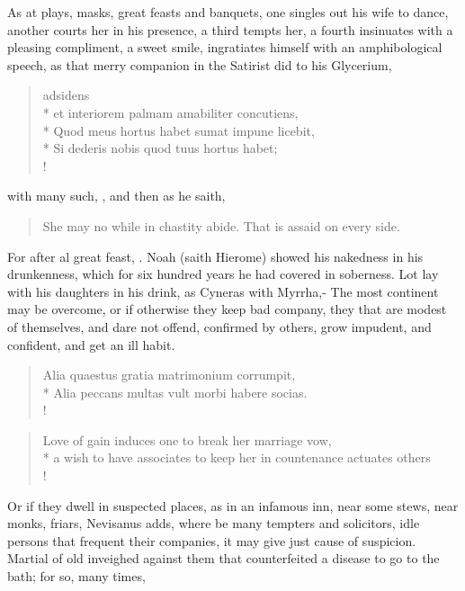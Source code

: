 As at plays, masks, great feasts and banquets, one singles out his wife
to dance, another courts her in his presence, a third tempts her, a
fourth insinuates with a pleasing compliment, a sweet smile,
ingratiates himself with an amphibological speech, as that merry
companion in the Satirist did to his Glycerium,
%
\begin{latin}%
\begin{verse}%
adsidens\\*
et interiorem palmam amabiliter concutiens,\\*
Quod meus hortus habet sumat impune licebit,\\*
Si dederis nobis quod tuus hortus habet;\\!
\end{verse}%
\end{latin}%
%
with many such, \etc{}, and then as he saith,
%
\begin{verse}%
She may no while in chastity abide.
That is assaid on every side.
\end{verse}%
%
For after al great feast, .
Noah (saith Hierome) showed his nakedness in his drunkenness,
which for six hundred years he had covered in soberness. Lot lay with
his daughters in his drink, as Cyneras with Myrrha,- The most continent may be overcome, or if otherwise
they keep bad company, they that are modest of themselves, and dare not
offend, confirmed by others, grow impudent, and confident, and
get an ill habit.
%
\begin{latin}%
\begin{verse}%
Alia quaestus gratia matrimonium corrumpit,\\*
Alia peccans multas vult morbi habere socias.\\!
\end{verse}%
\end{latin}%
\translationrule%
\begin{verse}%
Love of gain induces one to break her marriage vow,\\*
a wish to have associates to keep her in countenance actuates others\\!
\end{verse}%
%

Or if they dwell in suspected places, as in an infamous inn, near some
stews, near monks, friars, Nevisanus adds, where be many tempters and
solicitors, idle persons that frequent their companies, it may give
just cause of suspicion. Martial of old inveighed against them that
counterfeited a disease to go to the bath; for so, many times,

